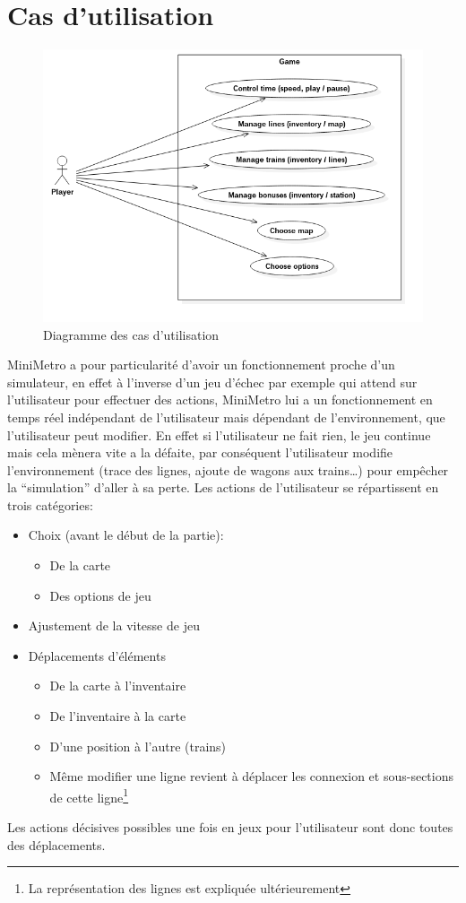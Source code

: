 \documentclass[report, backcover, french, nodocumentinfo]{upmethodology-document}
\begin{document}
		\section{Cas d'utilisation}\label{useCases}
			\begin{figure}[h!]
				\centering
				\includegraphics[width=\textwidth]{figures/UseCaseDiagram}
				\caption{Diagramme des cas d'utilisation}
				\label{fig:UseCaseDiagram}
			\end{figure}
				MiniMetro a pour particularité d'avoir un fonctionnement proche d'un simulateur, en effet à l'inverse d'un jeu d'échec par exemple qui attend sur l'utilisateur pour effectuer des actions, MiniMetro lui a un fonctionnement en temps réel indépendant de l'utilisateur mais dépendant de l’environnement, que l'utilisateur peut modifier. En effet si l'utilisateur ne fait rien, le jeu continue mais cela mènera vite a la défaite, par conséquent l'utilisateur modifie l’environnement (trace des lignes, ajoute de wagons aux trains\ldots) pour empêcher la ``simulation'' d'aller à sa perte.
				Les actions de l'utilisateur se répartissent en trois catégories:
				\begin{itemize}
					\item Choix (avant le début de la partie):
						\begin{itemize}
							\item De la carte
							\item Des options de jeu
						\end{itemize}
					\item Ajustement de la vitesse de jeu
					\item Déplacements d'éléments
						\begin{itemize}
							\item De la carte à l'inventaire
							\item De l'inventaire à la carte
							\item D'une position à l'autre (trains)
							\item Même modifier une ligne revient à déplacer les connexion et sous-sections de cette ligne\footnote{La représentation des lignes est expliquée ultérieurement}
						\end{itemize}
				\end{itemize}
				Les actions décisives possibles une fois en jeux pour l'utilisateur sont donc toutes des déplacements.
\end{document}
